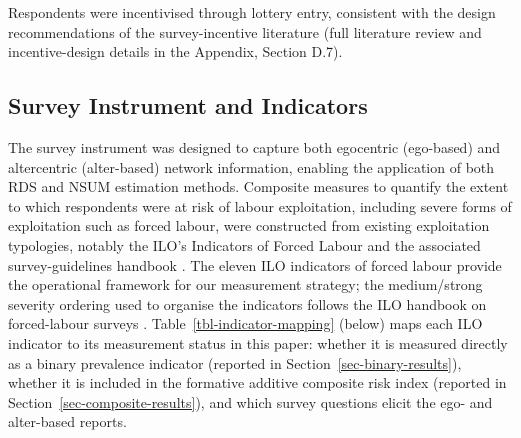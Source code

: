 \documentclass[
  12pt,
  letterpaper,
  DIV=11,
  numbers=noendperiod]{scrartcl}
\begin{document}
Respondents were incentivised through lottery entry, consistent with the
design recommendations of the survey-incentive literature (full
literature review and incentive-design details in the Appendix, Section
D.7).

\subsection{Survey Instrument and
Indicators}\label{sec-survey-instrument}

The survey instrument was designed to capture both egocentric
(ego-based) and altercentric (alter-based) network information, enabling
the application of both RDS and NSUM estimation methods. Composite
measures to quantify the extent to which respondents were at risk of
labour exploitation, including severe forms of exploitation such as
forced labour, were constructed from existing exploitation typologies,
notably the ILO's Indicators of Forced Labour
\autocite{ILO11-indicators,int25-ilo} and the associated
survey-guidelines handbook \autocite{hard24-ilo}. The eleven ILO
indicators of forced labour \autocite{ILO11-indicators,int25-ilo}
provide the operational framework for our measurement strategy; the
medium/strong severity ordering used to organise the indicators follows
the ILO handbook on forced-labour surveys \autocite{hard24-ilo}.
Table~\ref{tbl-indicator-mapping} (below) maps each ILO indicator to its
measurement status in this paper: whether it is measured directly as a
binary prevalence indicator (reported in
Section~\ref{sec-binary-results}), whether it is included in the
formative additive composite risk index (reported in
Section~\ref{sec-composite-results}), and which survey questions elicit
the ego- and alter-based reports.
\end{document}
